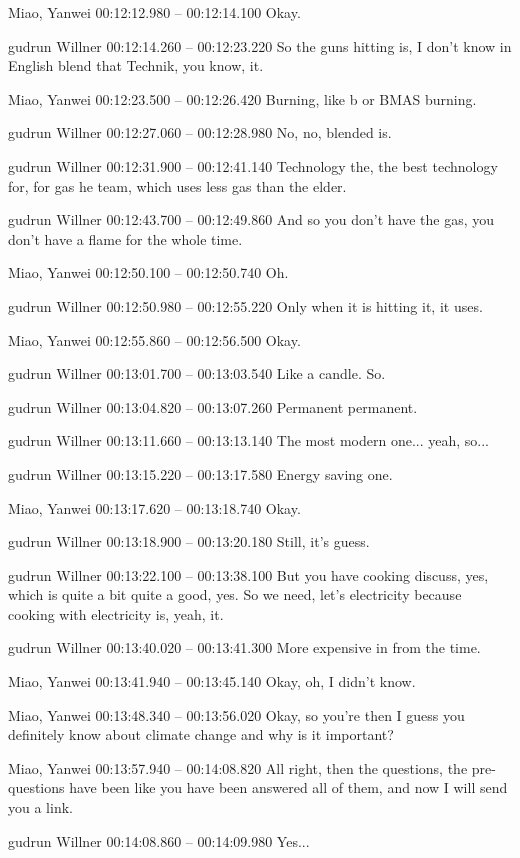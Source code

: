 {Miao, Yanwei 00:12:12.980 -- 00:12:14.100
Okay.

gudrun Willner 00:12:14.260 -- 00:12:23.220
So the guns hitting is, I don't know in English blend that Technik, you know, it.

Miao, Yanwei 00:12:23.500 -- 00:12:26.420
Burning, like b or BMAS burning.

gudrun Willner 00:12:27.060 -- 00:12:28.980
No, no, blended is.

gudrun Willner 00:12:31.900 -- 00:12:41.140
Technology the, the best technology for, for gas he team, which uses less gas than the elder.

gudrun Willner 00:12:43.700 -- 00:12:49.860
And so you don't have the gas, you don't have a flame for the whole time.

Miao, Yanwei 00:12:50.100 -- 00:12:50.740
Oh.

gudrun Willner 00:12:50.980 -- 00:12:55.220
Only when it is hitting it, it uses.

Miao, Yanwei 00:12:55.860 -- 00:12:56.500
Okay.

gudrun Willner 00:13:01.700 -- 00:13:03.540
Like a candle. So.

gudrun Willner 00:13:04.820 -- 00:13:07.260
Permanent permanent.

gudrun Willner 00:13:11.660 -- 00:13:13.140
The most modern one... yeah, so...

gudrun Willner 00:13:15.220 -- 00:13:17.580
Energy saving one.

Miao, Yanwei 00:13:17.620 -- 00:13:18.740
Okay.

gudrun Willner 00:13:18.900 -- 00:13:20.180
Still, it's guess.

gudrun Willner 00:13:22.100 -- 00:13:38.100
But you have cooking discuss, yes, which is quite a bit quite a good, yes. So we need, let's electricity because cooking with electricity is, yeah, it.

gudrun Willner 00:13:40.020 -- 00:13:41.300
More expensive in from the time.

Miao, Yanwei 00:13:41.940 -- 00:13:45.140
Okay, oh, I didn't know.

Miao, Yanwei 00:13:48.340 -- 00:13:56.020
Okay, so you're then I guess you definitely know about climate change and why is it important?

Miao, Yanwei 00:13:57.940 -- 00:14:08.820
All right, then the questions, the pre- questions have been like you have been answered all of them, and now I will send you a link.

gudrun Willner 00:14:08.860 -- 00:14:09.980
Yes...

}
